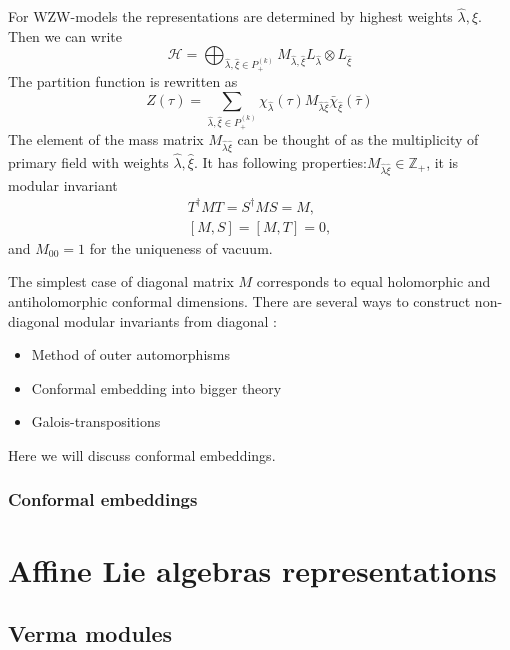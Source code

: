 \documentclass[a4paper,12pt]{article}
\theoremstyle{definition} \newtheorem{Def}{Definition}
\begin{document}
For WZW-models the representations are determined by highest weights $\hat \lambda, \hat \xi$. Then we can write
\begin{equation}
  \label{eq:105}
  \mathcal{H}=\bigoplus_{\hat \lambda,\hat \xi\in P^{(k)}_{+}}M_{\hat \lambda,\hat \xi} L_{\hat \lambda}\otimes L_{\hat \xi}
\end{equation}
The partition function is rewritten as
\begin{equation}
  \label{eq:106}
  Z(\tau)=\sum_{\hat \lambda,\hat \xi\in P^{(k)}_{+}} \chi_{\hat \lambda}(\tau)M_{\hat \lambda\hat\xi}\bar \chi_{\hat \xi}(\bar \tau)
\end{equation}
The element of the mass matrix $M_{\hat \lambda\hat\xi}$ can be thought of as the multiplicity of primary field with weights $\hat\lambda,\hat \xi$. It has following properties:$M_{\hat \lambda\hat\xi}\in \mathbb{Z}_+$, it is modular invariant
\begin{equation}
  \label{eq:108}
  \begin{aligned}
    T^{\dagger}MT=S^{\dagger}MS=M,\\
    [M,S]=[M,T]=0,
  \end{aligned}
\end{equation}
and $M_{00}=1$ for the uniqueness of vacuum. 

The simplest case of diagonal matrix $M$ corresponds to equal holomorphic and antiholomorphic conformal dimensions. There are several ways to construct non-diagonal modular invariants from diagonal \cite{difrancesco1997cft}:
\begin{itemize}
\item Method of outer automorphisms
\item Conformal embedding into bigger theory
\item Galois-transpositions
\end{itemize}
Here we will discuss conformal embeddings.

\subsubsection{Conformal embeddings}
\label{sec:conformal-embeddings}


\section{Affine Lie algebras representations}
\label{sec:affine-lie-algebras}

\subsection{Verma modules}
\label{sec:verma-modules}
\end{document}

